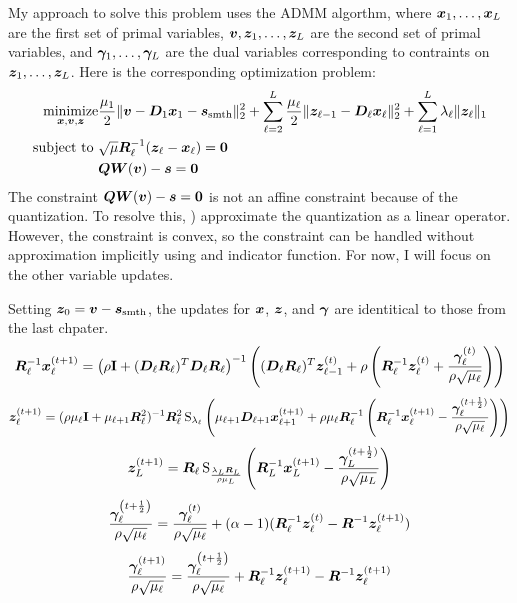 My approach to solve this problem uses the ADMM algorthm, where $\bm{x}_1,\ldots,\bm{x}_L$ are the first set of primal variables, $\bm{v},\bm{z}_1,\ldots,\bm{z}_L$ are the second set of primal variables,  and $\bm{\gamma}_1,\ldots,\bm{\gamma}_L$ are the dual variables corresponding to contraints on $\bm{z}_1,\ldots,\bm{z}_L$.  Here is the corresponding optimization problem:
%
\begin{equation}
\begin{aligned}
\operatorname*{\text{minimize}}_{\bm{x},\bm{v},\bm{z}} & \frac{\mu_1}{2}\|\bm{v} - \bm{D}_1\bm{x}_1  - \bm{s}_{\text{smth}}\|_2^2 + \sum_{\ell = 2}^L \frac{\mu_{\ell}}{2}\|\bm{z}_{\ell - 1} - \bm{D}_{\ell}\bm{x}_{\ell}\|_2^2 + \sum_{\ell = 1}^L \lambda_{\ell}\|\bm{z}_{\ell}\|_1 \\
\text{subject to } & \sqrt{\mu}\bm{R}_{\ell}^{-1}(\bm{z}_{\ell} - \bm{x}_{\ell}) = \bm{0} \\
                   & \bm{Q}\bm{W}(\bm{v}) - \bm{s} = \bm{0}
\end{aligned}
\end{equation}
%
The constraint $\bm{Q}\bm{W}(\bm{v}) - \bm{s} = \bm{0}$ is not an affine constraint because of the quantization. To resolve this, \cite{chodosh2020use}) approximate the quantization as a linear operator. However, the constraint is convex, so the constraint can be handled without approximation implicitly using and indicator function. For now, I will focus on the other variable updates.

Setting $\bm{z}_0 = \bm{v} - \bm{s}_{\text{smth}}$, the updates for $\bm{x}$, $\bm{z}$, and $\bm{\gamma}$ are identitical to those from the last chpater.
%
\begin{equation}
\bm{R}_{\ell}^{-1}\bm{x}_{\ell}^{(t + 1)} = \left(\rho {\bf I} + (\bm{D}_{\ell}\bm{R}_{\ell})^T\bm{D}_{\ell}\bm{R}_{\ell}\right)^{-1}\left((\bm{D}_{\ell}\bm{R}_{\ell})^T\bm{z}_{\ell - 1}^{(t)} + \rho \left(\bm{R}_{\ell}^{-1}\bm{z}_{\ell}^{(t)} + \frac{\bm{\gamma}_{\ell}^{(t)}}{\rho\sqrt{\mu_{\ell}}}\right)\right)
\end{equation}
%
\begin{equation}
\bm{z}_{\ell}^{(t + 1)} = (\rho\mu_{\ell}{\bf I} + \mu_{\ell + 1}\bm{R}_{\ell}^2)^{-1}\bm{R}_{\ell}^2\operatorname{S}_{\lambda_{\ell}}\left(\mu_{\ell + 1}\bm{D}_{\ell + 1}\bm{x}_{\ell + 1}^{(t + 1)} + \rho\mu_{\ell}\bm{R}_{\ell}^{-1}\left(\bm{R}_{\ell}^{-1}\bm{x}_{\ell}^{(t + 1)} - \frac{\bm{\gamma}_{\ell}^{(t + \frac{1}{2})}}{\rho\sqrt{\mu_{\ell}}}\right)\right)
\end{equation}
%
\begin{equation}
\bm{z}_L^{(t + 1)} = \bm{R}_{\ell}\operatorname{S}_{\frac{\lambda_L\bm{R}_L}{\rho\mu_L}}\left(\bm{R}_L^{-1}\bm{x}_L^{(t + 1)} - \frac{\bm{\gamma}_L^{(t + \frac{1}{2})}}{\rho\sqrt{\mu_L}}\right)
\end{equation}
%
\begin{equation}
\frac{\bm{\gamma}_{\ell}^{\left(t + \frac{1}{2}\right)}}{\rho\sqrt{\mu_{\ell}}} = \frac{\bm{\gamma}_{\ell}^{(t)}}{\rho\sqrt{\mu_{\ell}}} + (\alpha - 1)(\bm{R}_{\ell}^{-1}\bm{z}_{\ell}^{(t)} - \bm{R}^{-1}\bm{z}_{\ell}^{(t + 1)})
\end{equation}
%
\begin{equation}
\frac{\bm{\gamma}_{\ell}^{(t + 1)}}{\rho\sqrt{\mu_{\ell}}} = \frac{\bm{\gamma}_{\ell}^{\left(t + \frac{1}{2}\right)}}{\rho\sqrt{\mu_{\ell}}} + \bm{R}_{\ell}^{-1}\bm{z}_{\ell}^{(t + 1)} - \bm{R}^{-1}\bm{z}_{\ell}^{(t + 1)} 
\end{equation}
%

